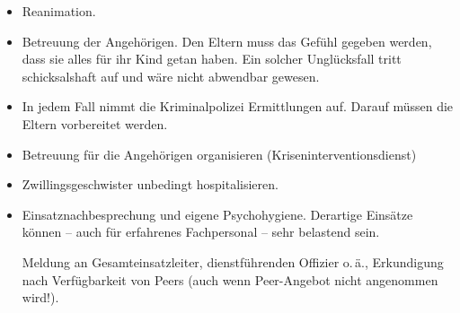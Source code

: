 \label{m:sids}
\begin{itemize}
	\item Reanimation.
	\item Betreuung der Angehörigen. Den Eltern muss das Gefühl
	gegeben werden, dass sie alles für ihr Kind getan haben. Ein solcher
	Unglücksfall tritt schicksalshaft auf und wäre nicht abwendbar gewesen. 
	\item In jedem Fall nimmt die Kriminalpolizei Ermittlungen auf. Darauf müssen
	die Eltern vorbereitet werden. 
	\item Betreuung für die Angehörigen organisieren
	(Kriseninterventionsdienst)
	\item Zwillingsgeschwister unbedingt hospitalisieren.
	\item Einsatznachbesprechung und eigene Psychohygiene. Derartige Einsätze
	können -- auch für erfahrenes Fachpersonal -- sehr belastend sein. 
	
    Meldung an Gesamteinsatzleiter, dienstführenden
    Offizier o.\,ä., Erkundigung nach Verfügbarkeit von
    Peers (auch wenn Peer-Angebot nicht angenommen wird!). 
\end{itemize}
